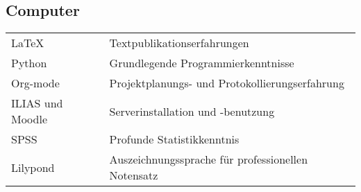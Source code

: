 \documentclass[11pt]{article}
\begin{document}
\subsection{Computer}
\label{sec-3-5}
\begin{center}
\begin{tabular}{ll}
\hline
\LaTeX{} & Textpublikationserfahrungen\\
Python & Grundlegende Programmierkenntnisse\\
Org-mode & Projektplanungs- und Protokollierungserfahrung\\
ILIAS und Moodle & Serverinstallation und -benutzung\\
SPSS & Profunde Statistikkenntnis\\
Lilypond & Auszeichnungssprache für professionellen Notensatz\\
\hline
\end{tabular}
\end{center}
\end{document}

